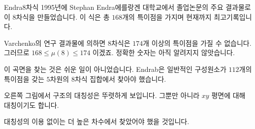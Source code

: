 \begin{surferPage}[Endraß의 $8$차식]{Endra $8$차식}
     1995년에 Stephan Endra 에를랑겐 대학교에서 졸업논문의 주요 결과물로 이 $8$차식을 만들었습니다. 이 식은 총 $168$개의 특이점을 가지며 현재까지 최고기록입니다.

    Varchenko의 연구 결과물에 의하면 $8$차식은 $174$개 이상의 특이점을 가질 수 없습니다. 그러므로 $168 \le \mu(8) \le 174$ 이겠죠. 정확한 숫자는 아직 알려지지 않앗습니다.

    이 곡면을 찾는 것은 쉬운 일이 아니었습니다. Endrab은 일반적인 구성원소가 $112$개의 특이점을 갖는 $5$차원의 $8$차식 집합에서 찾아야 했습니다. 
 

    오른쪽 그림에서 구조의 대칭성은 뚜렷하게 보입니다. 그뿐만 아니라 $xy$ 평면에 대해 대칭이기도 합니다. 

    대칭성의 이용 없이는 더 높은 차수에서 찾았어야 했을 것입니다.
\end{surferPage}
